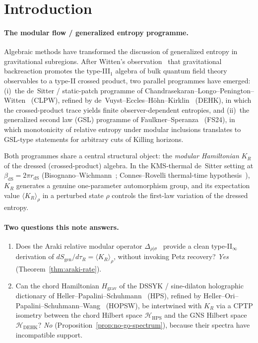 \documentclass[12pt,a4paper]{article}
\theoremstyle{definition}
\begin{document}
\section{Introduction}
\label{sec:intro}

\paragraph{The modular flow / generalized entropy programme.}
Algebraic methods have transformed the discussion of generalized entropy in
gravitational subregions. After Witten's observation~\cite{Witten2022} that
gravitational backreaction promotes the type-III$_1$ algebra of bulk
quantum field theory observables to a type-II crossed product, two parallel
programmes have emerged:
(i)~the de~Sitter / static-patch programme of
Chandrasekaran--Longo--Penington--Witten~\cite{CLPW2023} (CLPW), refined by
de~Vuyst--Eccles--H\"{o}hn--Kirklin~\cite{DEHK2025a} (DEHK), in which the
crossed-product trace yields finite observer-dependent entropies, and
(ii)~the generalized second law (GSL) programme of
Faulkner--Speranza~\cite{FaulknerSperanza2024} (FS24), in which monotonicity
of relative entropy under modular inclusions translates to GSL-type
statements for arbitrary cuts of Killing horizons.

Both programmes share a central structural object: the \emph{modular
Hamiltonian} $K_R$ of the dressed (crossed-product) algebra. In the
KMS-thermal de~Sitter setting at $\beta_{\mathrm{dS}} = 2\pi r_{\mathrm{dS}}$
(Bisognano--Wichmann~\cite{BisognanoWichmann1976}; Connes--Rovelli
thermal-time hypothesis~\cite{ConnesRovelli1994}), $K_R$ generates a
genuine one-parameter automorphism group, and its expectation value
$\langle K_R \rangle_\rho$ in a perturbed state $\rho$ controls the
first-law variation of the dressed entropy.

\paragraph{Two questions this note answers.}
\begin{enumerate}
\item Does the Araki relative modular operator
$\Delta_{\rho|\sigma}$~\cite{Araki1976} provide a clean type-II$_\infty$
derivation of $dS_{\mathrm{gen}}/d\tau_R = \langle K_R \rangle_\rho$,
without invoking Petz recovery? \emph{Yes} (Theorem~\ref{thm:araki-rate}).

\item Can the chord Hamiltonian $H_{\mathrm{grav}}$ of the
DSSYK / sine-dilaton holographic dictionary
of Heller--Papalini--Schuhmann~\cite{HPS2024} (HPS), refined by
Heller--Ori--Papalini--Schuhmann--Wang~\cite{HOPSW2025} (HOPSW), be
intertwined with $K_R$ via a CPTP isometry between the chord Hilbert space
$\mathcal{H}_{\mathrm{HPS}}$ and the GNS Hilbert space
$\mathcal{H}_{\mathrm{DEHK}}$? \emph{No} (Proposition~\ref{prop:no-go-spectrum}),
because their spectra have incompatible support.
\end{enumerate}
\end{document}
